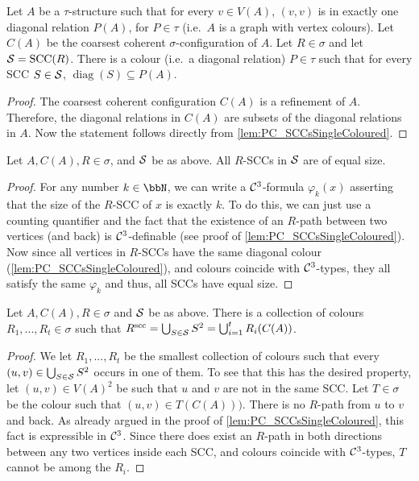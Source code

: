 \documentclass[a4paper,UKenglish,cleveref, autoref, thm-restate]{lipics-v2021}
\renewcommand{\phi}{\varphi}
\renewcommand{\phi}{\varphi}
\newcommand{\Cc}{{\cal C}}
\newcommand{\Ss}{{\cal S}}
\newcommand{\scc}{{\operatorname{scc}}}
\newcommand{\sccs}{{\operatorname{SCC}}}
\newcommand{\diag}{{\operatorname{diag}}}
\begin{document}
	
	\begin{corollary}
		\label{cor:PC_SCCsSingleVertexColoured}
		Let $A$ be a $\tau$-structure such that for every $v \in V(A)$, $(v,v)$ is in exactly one diagonal relation $P(A)$, for $P \in \tau$ (i.e.\ $A$ is a graph with vertex colours).
		Let $C(A)$ be the coarsest coherent $\sigma$-configuration of $A$. Let $R \in \sigma$ and let $\Ss = \sccs(R)$. There is a colour (i.e.\ a diagonal relation) $P \in \tau$ such that for every SCC $S \in \Ss$, $\diag(S) \subseteq P(A)$.
	\end{corollary}	
	\begin{proof}
		The coarsest coherent configuration $C(A)$ is a refinement of $A$. Therefore, the diagonal relations in $C(A)$ are subsets of the diagonal relations in $A$. Now the statement follows directly from \autoref{lem:PC_SCCsSingleColoured}.
	\end{proof}
	
	
	
	\begin{lemma}
		\label{lem:PC_SCCequalSize}
		Let $A,C(A), R \in \sigma$, and $\Ss$ be as above. All $R$-SCCs in $\Ss$ are of equal size.
	\end{lemma}
	\begin{proof}
		For any number $k \in \bbN$, we can write a $\Cc^3$-formula $\phi_k(x)$ asserting that the size of the $R$-SCC of $x$ is exactly $k$. To do this, we can just use a counting quantifier and the fact that the existence of an $R$-path between two vertices (and back) is $\Cc^3$-definable (see proof of \autoref{lem:PC_SCCsSingleColoured}). Now since all vertices in $R$-SCCs have the same diagonal colour (\autoref{lem:PC_SCCsSingleColoured}), and colours coincide with $\Cc^3$-types, they all satisfy the same $\phi_k$ and thus, all SCCs have equal size.
	\end{proof}
	
	\begin{lemma}
		\label{lem:PC_differentColours}
		Let $A,C(A), R \in \sigma$ and $\Ss$ be as above.
		There is a collection of colours $R_1,...,R_t \in \sigma$ such that $R^\scc = \bigcup_{S \in \Ss} S^2 = \bigcup_{i =1}^t R_i(C(A))$.
	\end{lemma}
	\begin{proof}
		We let $R_1,...,R_t$ be the smallest collection of colours such that every $(u,v) \in \bigcup_{S \in \Ss} S^2$ occurs in one of them. To see that this has the desired property, let $(u,v) \in V(A)^2$ be such that $u$ and $v$ are not in the same SCC. 
		Let $T \in \sigma$ be the colour such that $(u,v) \in T(C(A)))$. There is no $R$-path from $u$ to $v$ and back. As already argued in the proof of \autoref{lem:PC_SCCsSingleColoured}, this fact is expressible in $\Cc^3$. Since there does exist an $R$-path in both directions between any two vertices inside each SCC, and colours coincide with $\Cc^3$-types, $T$ cannot be among the $R_i$.
	\end{proof}
	
\end{document}
